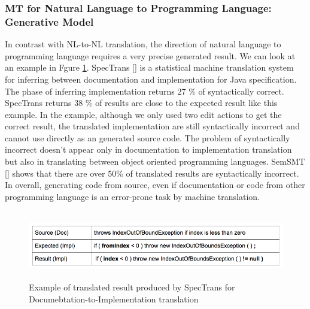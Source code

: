 \subsubsection{MT for Natural Language to Programming Language: Generative Model}
In contrast with NL-to-NL translation, the direction of natural language to programming language requires a very precise generated result. We can look at an example in Fgure \ref{fig:SpecTransExample}. SpecTrans [\cite{Phan:2017:SLI:3102962.3102971}] is a statistical machine translation system for inferring between documentation and implementation for Java specification. The phase of inferring implementation returns 27 \% of syntactically correct. SpecTrans returns 38 \% of results are close to the expected result like this example. In the example, although we only used two edit actions to get the correct result, the translated implementation are still syntactically incorrect and cannot use directly as an generated source code. The problem of syntactically incorrect doesn't appear only in documentation to implementation translation but also in translating between object oriented programming languages. SemSMT [\cite{Nguyen:2013:LSM:2491411.2494584}] shows that there are over 50\% of translated results are syntactically incorrect. In overall, generating code from source, even if documentation or code from other programming language is an error-prone task by machine translation.
\begin{figure}[htp]
	\centering
	\includegraphics[width=14cm,height=3cm]{resources/fig_spectrans_example.png}
	\caption[Example of translated result produced by SpecTrans for Documebtation-to-Implementation translation ] {Example of translated result produced by SpecTrans for Documebtation-to-Implementation translation}
	\label{fig:SpecTransExample}
\end{figure}
